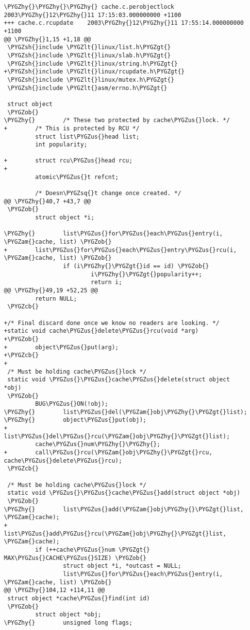 \documentclass[a4paper,8pt,english]{sphinxmanual}
\def\PYGZus{\char`\_}
\def\PYGZob{\char`\{}
\def\PYGZcb{\char`\}}
\def\PYGZam{\char`\&}
\def\PYGZlt{\char`\<}
\def\PYGZgt{\char`\>}
\def\PYGZsh{\char`\#}
\def\PYGZhy{\char`\-}
\def\PYGZsq{\char`\'}
\renewcommand\PYGZsq{\textquotesingle}
\begin{document}
\begin{Verbatim}[commandchars=\\\{\}]
\PYGZhy{}\PYGZhy{}\PYGZhy{} cache.c.perobjectlock   2003\PYGZhy{}12\PYGZhy{}11 17:15:03.000000000 +1100
+++ cache.c.rcupdate    2003\PYGZhy{}12\PYGZhy{}11 17:55:14.000000000 +1100
@@ \PYGZhy{}1,15 +1,18 @@
 \PYGZsh{}include \PYGZlt{}linux/list.h\PYGZgt{}
 \PYGZsh{}include \PYGZlt{}linux/slab.h\PYGZgt{}
 \PYGZsh{}include \PYGZlt{}linux/string.h\PYGZgt{}
+\PYGZsh{}include \PYGZlt{}linux/rcupdate.h\PYGZgt{}
 \PYGZsh{}include \PYGZlt{}linux/mutex.h\PYGZgt{}
 \PYGZsh{}include \PYGZlt{}asm/errno.h\PYGZgt{}

 struct object
 \PYGZob{}
\PYGZhy{}        /* These two protected by cache\PYGZus{}lock. */
+        /* This is protected by RCU */
         struct list\PYGZus{}head list;
         int popularity;

+        struct rcu\PYGZus{}head rcu;
+
         atomic\PYGZus{}t refcnt;

         /* Doesn\PYGZsq{}t change once created. */
@@ \PYGZhy{}40,7 +43,7 @@
 \PYGZob{}
         struct object *i;

\PYGZhy{}        list\PYGZus{}for\PYGZus{}each\PYGZus{}entry(i, \PYGZam{}cache, list) \PYGZob{}
+        list\PYGZus{}for\PYGZus{}each\PYGZus{}entry\PYGZus{}rcu(i, \PYGZam{}cache, list) \PYGZob{}
                 if (i\PYGZhy{}\PYGZgt{}id == id) \PYGZob{}
                         i\PYGZhy{}\PYGZgt{}popularity++;
                         return i;
@@ \PYGZhy{}49,19 +52,25 @@
         return NULL;
 \PYGZcb{}

+/* Final discard done once we know no readers are looking. */
+static void cache\PYGZus{}delete\PYGZus{}rcu(void *arg)
+\PYGZob{}
+        object\PYGZus{}put(arg);
+\PYGZcb{}
+
 /* Must be holding cache\PYGZus{}lock */
 static void \PYGZus{}\PYGZus{}cache\PYGZus{}delete(struct object *obj)
 \PYGZob{}
         BUG\PYGZus{}ON(!obj);
\PYGZhy{}        list\PYGZus{}del(\PYGZam{}obj\PYGZhy{}\PYGZgt{}list);
\PYGZhy{}        object\PYGZus{}put(obj);
+        list\PYGZus{}del\PYGZus{}rcu(\PYGZam{}obj\PYGZhy{}\PYGZgt{}list);
         cache\PYGZus{}num\PYGZhy{}\PYGZhy{};
+        call\PYGZus{}rcu(\PYGZam{}obj\PYGZhy{}\PYGZgt{}rcu, cache\PYGZus{}delete\PYGZus{}rcu);
 \PYGZcb{}

 /* Must be holding cache\PYGZus{}lock */
 static void \PYGZus{}\PYGZus{}cache\PYGZus{}add(struct object *obj)
 \PYGZob{}
\PYGZhy{}        list\PYGZus{}add(\PYGZam{}obj\PYGZhy{}\PYGZgt{}list, \PYGZam{}cache);
+        list\PYGZus{}add\PYGZus{}rcu(\PYGZam{}obj\PYGZhy{}\PYGZgt{}list, \PYGZam{}cache);
         if (++cache\PYGZus{}num \PYGZgt{} MAX\PYGZus{}CACHE\PYGZus{}SIZE) \PYGZob{}
                 struct object *i, *outcast = NULL;
                 list\PYGZus{}for\PYGZus{}each\PYGZus{}entry(i, \PYGZam{}cache, list) \PYGZob{}
@@ \PYGZhy{}104,12 +114,11 @@
 struct object *cache\PYGZus{}find(int id)
 \PYGZob{}
         struct object *obj;
\PYGZhy{}        unsigned long flags;


\end{Verbatim}
\end{document}
